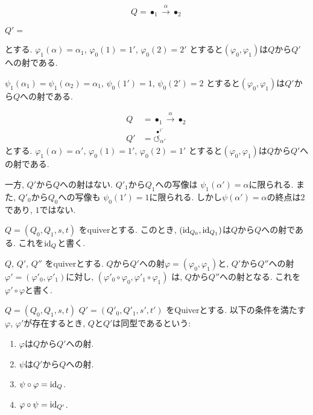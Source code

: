 \begin{example}
  \begin{align*}
    Q=\bullet_{1} \xrightarrow{\alpha} \bullet_{2}
  \end{align*}
  \begin{center}
    $Q'=$
  \end{center}
  とする.
  $\varphi_1(\alpha)=\alpha_1$,
  $\varphi_0(1)=1'$,
  $\varphi_0(2)=2'$
  とすると$(\varphi_0,\varphi_1)$は$Q$から$Q'$への射である.

  $\psi_1(\alpha_1)=\psi_1(\alpha_2)=\alpha_1$,
  $\psi_0(1')=1$,
  $\psi_0(2')=2$
  とすると$(\varphi_0,\varphi_1)$は$Q'$から$Q$への射である.  
\end{example}

\begin{example}
  \begin{align*}
    Q&=\bullet_{1} \xrightarrow{\alpha} \bullet_{2}\\
    Q'&=
    {\stackrel{\bullet^{1'}}{\circlearrowleft_{\alpha'}}}
  \end{align*}
  とする.
  $\varphi_1(\alpha)=\alpha'$,
  $\varphi_0(1)=1'$,
  $\varphi_0(2)=1'$
  とすると$(\varphi_0,\varphi_1)$は$Q$から$Q'$への射である.

  一方, $Q'$から$Q$への射はない.
  $Q'_1$から$Q_1$への写像は
  $\psi_1(\alpha')=\alpha$に限られる.
  また, $Q'_0$から$Q_0$への写像も
  $\psi_0(1')=1$に限られる.
  しかし$\psi(\alpha')=\alpha$の終点は$2$であり, $1$ではない.
\end{example}


\begin{example}
  $Q=(Q_0,Q_1,s,t)$
  をquiverとする.
  このとき, $(\operatorname{id}_{Q_0},\operatorname{id}_{Q_1})$は$Q$から$Q$への射である.
  これを$\operatorname{id}_Q$と書く.
\end{example}
\begin{example}
  $Q$, $Q'$, $Q''$
  をquiverとする.
  $Q$から$Q'$への射$\varphi=(\varphi_0,\varphi_1)$と,
  $Q'$から$Q''$への射$\varphi'=(\varphi'_0,\varphi'_1)$に対し,
  $(\varphi'_0\circ \varphi_0,\varphi'_1\circ \varphi_1)$
  は, $Q$から$Q''$への射となる.
  これを$\varphi' \circ \varphi$と書く.
\end{example}
\begin{definition}
  $Q=(Q_0,Q_1,s,t)$
  $Q'=(Q'_0,Q'_1,s',t')$
  をQuiverとする.
  以下の条件を満たす$\varphi$, $\varphi'$が存在するとき,
  $Q$と$Q'$は同型であるという:
  \begin{enumerate}
  \item $\varphi$は$Q$から$Q'$への射.
  \item $\psi$は$Q'$から$Q$への射.
  \item $\psi\circ\varphi=\operatorname{id}_{Q}$.
  \item $\varphi\circ\psi=\operatorname{id}_{Q'}$.
  \end{enumerate}
\end{definition}

